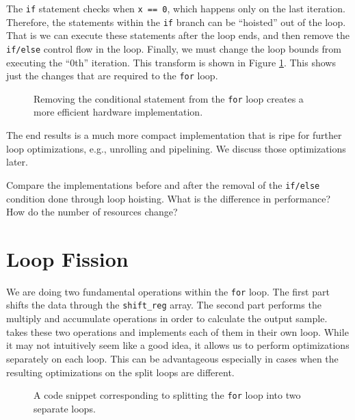 The \lstinline{if} statement checks when \lstinline{x == 0}, which happens only on the last iteration. Therefore, the statements within the \lstinline{if} branch can be ``hoisted'' out of the loop. That is we can execute these statements after the loop ends, and then remove the \lstinline{if/else} control flow in the loop. Finally, we must change the loop bounds from executing the ``0th'' iteration. This transform is shown in Figure \ref{fig:fir11_ifelse}. This shows just the changes that are required to the \lstinline{for} loop. 

\begin{figure}

\caption{ Removing the conditional statement from the \lstinline{for} loop creates a more efficient hardware implementation. }
\label{fig:fir11_ifelse}
\end{figure}

The end results is a much more compact implementation that is ripe for further loop optimizations, e.g., unrolling and pipelining. We discuss those optimizations later.

\begin{exercise}
Compare the implementations before and after the removal of the \lstinline{if/else} condition done through loop hoisting. What is the difference in performance? How do the number of resources change?
\end{exercise}


\section{Loop Fission}

We are doing two fundamental operations within the \lstinline{for} loop. The first part shifts the data through the \lstinline{shift_reg} array. The second part performs the multiply and accumulate operations in order to calculate the output sample.  takes these two operations and implements each of them in their own loop. While it may not intuitively seem like a good idea, it allows us to perform optimizations separately on each loop. This can be advantageous especially in cases when the resulting optimizations on the split loops are different. 

\begin{figure}

\caption{ A code snippet corresponding to splitting the \lstinline{for} loop into two separate loops. }
\label{fig:fir11_partition}
\end{figure}


